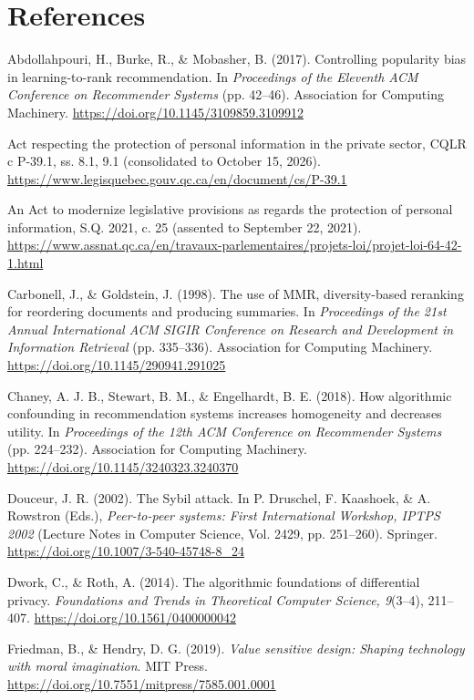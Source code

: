 \documentclass[11pt,letterpaper]{article}
\newenvironment{references}
  {\par\small\raggedright\setlength{\parskip}{3pt plus 1pt}\setlength{\parindent}{0pt}}
  {\par}
\newcommand{\refentry}{\par\noindent\hangindent=0.3in\hangafter=1\relax}
\begin{document}
\section{References}

\begin{references}
\refentry Abdollahpouri, H., Burke, R., \& Mobasher, B. (2017). Controlling popularity bias in
learning-to-rank recommendation. In \textit{Proceedings of the Eleventh ACM Conference on Recommender Systems}
(pp. 42--46). Association for Computing Machinery. \url{https://doi.org/10.1145/3109859.3109912}

\refentry Act respecting the protection of personal information in the private sector, CQLR c P-39.1, ss. 8.1,
9.1 (consolidated to October 15, 2026). \url{https://www.legisquebec.gouv.qc.ca/en/document/cs/P-39.1}

\refentry An Act to modernize legislative provisions as regards the protection of personal information, S.Q.
2021, c. 25 (assented to September 22, 2021).
\url{https://www.assnat.qc.ca/en/travaux-parlementaires/projets-loi/projet-loi-64-42-1.html}

\refentry Carbonell, J., \& Goldstein, J. (1998). The use of MMR, diversity-based reranking for reordering
documents and producing summaries. In \textit{Proceedings of the 21st Annual International ACM SIGIR
Conference on Research and Development in Information Retrieval} (pp. 335--336). Association for Computing
Machinery. \url{https://doi.org/10.1145/290941.291025}

\refentry Chaney, A. J. B., Stewart, B. M., \& Engelhardt, B. E. (2018). How algorithmic confounding in
recommendation systems increases homogeneity and decreases utility. In \textit{Proceedings of the 12th ACM
Conference on Recommender Systems} (pp. 224--232). Association for Computing Machinery.
\url{https://doi.org/10.1145/3240323.3240370}

\refentry Douceur, J. R. (2002). The Sybil attack. In P. Druschel, F. Kaashoek, \& A. Rowstron (Eds.),
\textit{Peer-to-peer systems: First International Workshop, IPTPS 2002} (Lecture Notes in Computer Science,
Vol. 2429, pp. 251--260). Springer. \url{https://doi.org/10.1007/3-540-45748-8_24}

\refentry Dwork, C., \& Roth, A. (2014). The algorithmic foundations of differential privacy.
\textit{Foundations and Trends in Theoretical Computer Science, 9}(3--4), 211--407.
\url{https://doi.org/10.1561/0400000042}

\refentry Friedman, B., \& Hendry, D. G. (2019). \textit{Value sensitive design: Shaping technology with moral
imagination}. MIT Press. \url{https://doi.org/10.7551/mitpress/7585.001.0001}


\end{references}
\end{document}
